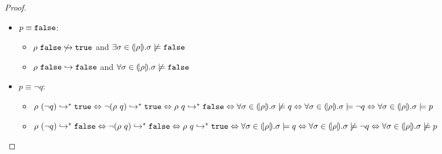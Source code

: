 \begin{proof}
\begin{itemize}
\item $ p \equiv \mathtt{false}$:
\begin{itemize}
\item $\rho\ \mathtt{false} \not \hookrightarrow \mathtt{true}$ and $\exists \sigma \in (\!|\rho|\!). \sigma \not \models \mathtt{false}$
\item $\rho\ \mathtt{false} \hookrightarrow \mathtt{false}$ and $\forall \sigma \in (\!|\rho|\!).\sigma \not \models \mathtt{false}$
\end{itemize}
\item $ p \equiv \lnot q$:
\begin{itemize}
\item
$
	\rho\ (\lnot q) \hookrightarrow_{}^{*} \mathtt{true} \Leftrightarrow
	\lnot (\rho\ q) \hookrightarrow_{}^{*} \mathtt{true} \Leftrightarrow
	\rho\ q \hookrightarrow_{}^{*} \mathtt{false} 		\Leftrightarrow
	\forall \sigma \in (\!|\rho|\!). \sigma \not \models q	 \Leftrightarrow
	\forall \sigma \in (\!|\rho|\!). \sigma \models \lnot q \Leftrightarrow
	\forall \sigma \in (\!|\rho|\!). \sigma \models p
$
\item
$
	\rho\ (\lnot q) \hookrightarrow_{}^{*} \mathtt{false} \Leftrightarrow
	\lnot (\rho\ q) \hookrightarrow_{}^{*} \mathtt{false} \Leftrightarrow
	\rho\ q \hookrightarrow_{}^{*} \mathtt{true} 		\Leftrightarrow
	\forall \sigma\in(\!|\rho|\!). \sigma \models q	 \Leftrightarrow
	\forall \sigma\in(\!|\rho|\!). \sigma \not \models \lnot q \Leftrightarrow
	\forall \sigma\in(\!|\rho|\!). \sigma \not \models p
$
\end{itemize}


\end{itemize}
\end{proof}

